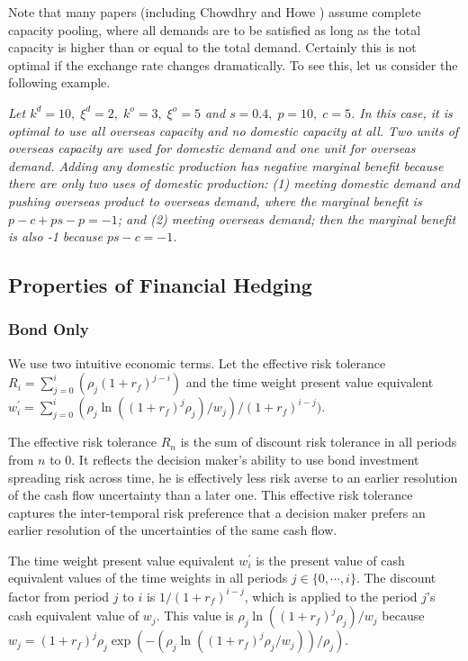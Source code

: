 \documentclass[mnsc,nonblindrev,copyedit]{informs2_wz} %
\begin{document}
Note that many papers (including Chowdhry and Howe \cite{Chowdhry1999}) assume complete capacity pooling, where all demands are to be satisfied as long as the total capacity is higher than or equal to the total demand.  Certainly this is not optimal if the exchange rate changes dramatically.  To see this, let us consider the following example.

\medskip


 {\em Let $k^d = 10,\; \xi^d = 2, \; k^o = 3,\; \xi^o = 5 $ and $s = 0.4, \; p = 10,\; c = 5$.  In this case, it is optimal to use all overseas capacity and no domestic capacity at all.  Two units of overseas capacity are used for domestic demand and one unit for overseas demand.  Adding any domestic production has negative marginal benefit because there are only two uses of domestic production: (1) meeting domestic demand and pushing overseas product to overseas demand, where the marginal benefit is $p-c + ps - p = -1$; and (2) meeting overseas demand; then the marginal benefit is also -1 because $ ps - c = -1$.}




\subsection{Properties of Financial Hedging}





\subsubsection{Bond Only}


We use two intuitive economic terms.  Let the effective risk tolerance $R_i =\sum_{j=0}^i (\rho_j(1+r_f)^{j-i})$ and the time weight present value equivalent $w^\prime_i = \sum_{j=0}^i(\rho_j \ln((1+r_f)^j \rho_j)/w_j)/(1+r_f)^{i-j})$.

The effective risk tolerance $R_n$ is the sum of discount risk tolerance in all periods from $n$ to $0$. It reflects the decision maker's ability to use bond investment spreading risk across time, he is effectively less risk averse to an earlier resolution of the cash flow uncertainty than a later one. This effective risk tolerance captures the inter-temporal risk preference that a decision maker prefers an earlier resolution of the uncertainties of the same cash flow.

The time weight present value equivalent $w^\prime_i$ is the present value of cash equivalent values of the time weights in all periods $j \in \{0, \cdots, i\}$.
The discount factor from period $j$ to $i$ is $1/(1+r_f)^{i-j}$, which is applied to the period $j$'s cash equivalent value of $w_j$. This value is $\rho_j\ln ((1+r_f)^j\rho_j)/w_j$ because $w_j = (1+r_f)^j \rho_j \exp(-(\rho_j\ln ((1+r_f)^j\rho_j/w_j))/\rho_j)$.
\end{document}
